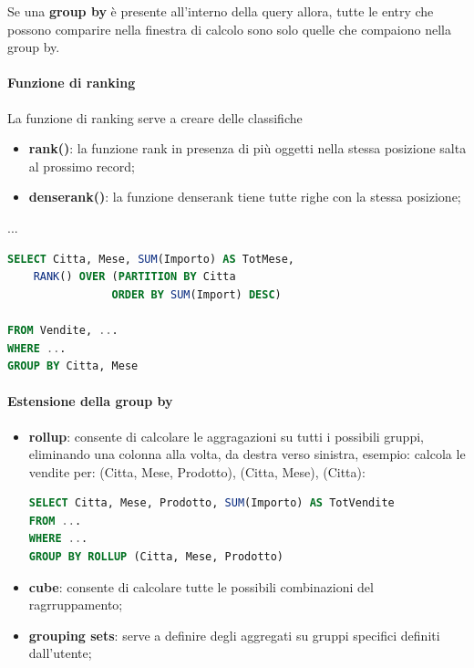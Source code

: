 \documentclass[12pt]{article}
\begin{document}
Se una \textbf{group by} \`e presente all'interno della query allora, tutte le entry che possono comparire nella finestra di calcolo sono solo quelle che compaiono nella group by.

\paragraph{Funzione di ranking}
La funzione di ranking serve a creare delle classifiche

\begin{itemize}
    \item \textbf{rank()}: la funzione rank in presenza di pi\`u oggetti nella stessa posizione salta al prossimo record;
    \item \textbf{denserank()}: la funzione denserank tiene tutte righe con la stessa posizione;
\end{itemize}

...
\begin{lstlisting}[language=sql]
SELECT Citta, Mese, SUM(Importo) AS TotMese,
    RANK() OVER (PARTITION BY Citta
                ORDER BY SUM(Import) DESC)

FROM Vendite, ...
WHERE ...
GROUP BY Citta, Mese
\end{lstlisting}



\paragraph{Estensione della group by}
\begin{itemize}
    \item \textbf{rollup}: consente di calcolare le aggragazioni su tutti i possibili gruppi, eliminando una colonna alla volta, da destra verso sinistra, esempio: calcola le vendite per: (Citta, Mese, Prodotto), (Citta, Mese), (Citta):
        \begin{lstlisting}[language=sql]
SELECT Citta, Mese, Prodotto, SUM(Importo) AS TotVendite
FROM ...
WHERE ...
GROUP BY ROLLUP (Citta, Mese, Prodotto)
        \end{lstlisting}
    \item \textbf{cube}: consente di calcolare tutte le possibili combinazioni del ragrruppamento;
    \item \textbf{grouping sets}: serve a definire degli aggregati su gruppi specifici definiti dall'utente;
\end{itemize}
\end{document}
